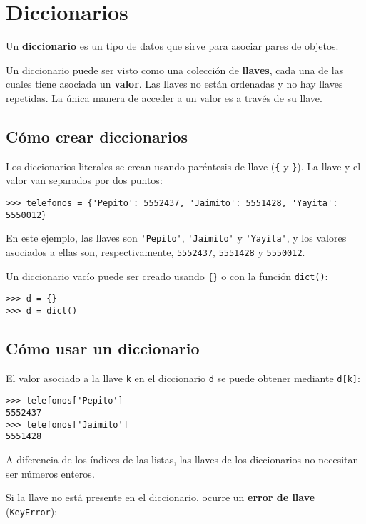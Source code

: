 \chapter{Diccionarios}

Un \textbf{diccionario} es un tipo de datos que sirve para asociar pares
de objetos.

Un diccionario puede ser visto como una colección de \textbf{llaves},
cada una de las cuales tiene asociada un \textbf{valor}. Las llaves no
están ordenadas y no hay llaves repetidas. La única manera de acceder a
un valor es a través de su llave.

\section{Cómo crear diccionarios}

Los diccionarios literales se crean usando paréntesis de llave
(\lstinline!{! y \lstinline!}!).
La llave y el valor van separados por dos puntos:
\begin{lstlisting}
>>> telefonos = {'Pepito': 5552437, 'Jaimito': 5551428, 'Yayita': 5550012}
\end{lstlisting}

En este ejemplo, las llaves son \lstinline!'Pepito'!,
\lstinline!'Jaimito'! y \lstinline!'Yayita'!, y los valores asociados a
ellas son, respectivamente, \lstinline!5552437!, \lstinline!5551428! y
\lstinline!5550012!.

Un diccionario vacío puede ser creado usando \lstinline!{}! o con la
función \lstinline!dict()!:

\begin{lstlisting}
>>> d = {}
>>> d = dict()
\end{lstlisting}

\section{Cómo usar un diccionario}

El valor asociado a la llave \lstinline!k! en el diccionario
\lstinline!d! se puede obtener mediante \lstinline!d[k]!:

\begin{lstlisting}
>>> telefonos['Pepito']
5552437
>>> telefonos['Jaimito']
5551428
\end{lstlisting}

A diferencia de los índices de las listas, las llaves de los
diccionarios no necesitan ser números enteros.

Si la llave no está presente en el diccionario, ocurre un \textbf{error
de llave} (\lstinline!KeyError!):

